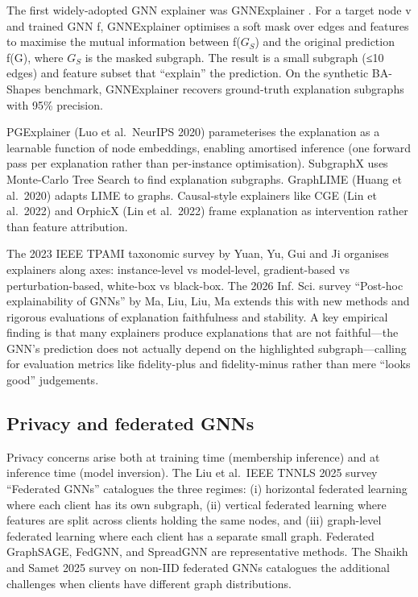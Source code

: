 \documentclass{article}
\begin{document}
The first widely-adopted GNN explainer was GNNExplainer \citep{ying2019gnnexplainergenera}. For a target node v and trained GNN f, GNNExplainer optimises a soft mask over edges and features to maximise the mutual information between f(\(G_S\)) and the original prediction f(G), where \(G_S\) is the masked subgraph. The result is a small subgraph (≤10 edges) and feature subset that ``explain'' the prediction. On the synthetic BA-Shapes benchmark, GNNExplainer recovers ground-truth explanation subgraphs with 95\% precision.

PGExplainer (Luo et al.~NeurIPS 2020) parameterises the explanation as a learnable function of node embeddings, enabling amortised inference (one forward pass per explanation rather than per-instance optimisation). SubgraphX \citep{yuan2022explainabilityingr} uses Monte-Carlo Tree Search to find explanation subgraphs. GraphLIME (Huang et al.~2020) adapts LIME to graphs. Causal-style explainers like CGE (Lin et al.~2022) and OrphicX (Lin et al.~2022) frame explanation as intervention rather than feature attribution.

The 2023 IEEE TPAMI taxonomic survey by Yuan, Yu, Gui and Ji organises explainers along axes: instance-level vs model-level, gradient-based vs perturbation-based, white-box vs black-box. The 2026 Inf. Sci. survey ``Post-hoc explainability of GNNs'' by Ma, Liu, Liu, Ma extends this with new methods and rigorous evaluations of explanation faithfulness and stability. A key empirical finding is that many explainers produce explanations that are not faithful---the GNN's prediction does not actually depend on the highlighted subgraph---calling for evaluation metrics like fidelity-plus and fidelity-minus rather than mere ``looks good'' judgements.

\subsection{Privacy and federated GNNs}\label{privacy-and-federated-gnns}

Privacy concerns arise both at training time (membership inference) and at inference time (model inversion). The Liu et al.~IEEE TNNLS 2025 survey ``Federated GNNs'' catalogues the three regimes: (i) horizontal federated learning where each client has its own subgraph, (ii) vertical federated learning where features are split across clients holding the same nodes, and (iii) graph-level federated learning where each client has a separate small graph. Federated GraphSAGE, FedGNN, and SpreadGNN are representative methods. The Shaikh and Samet 2025 survey on non-IID federated GNNs catalogues the additional challenges when clients have different graph distributions.
\end{document}
